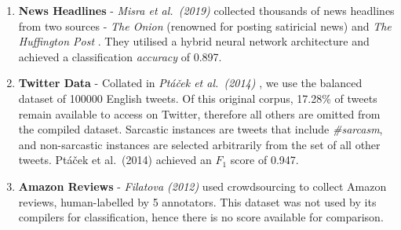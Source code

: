 \documentclass[12pt,a4paper]{article}
\begin{document}
\begin{enumerate}[leftmargin=0cm]
	\item \textbf{News Headlines} - \textit{Misra et al.\ (2019)} \cite{misra2019sarcasm} collected thousands of news headlines from two sources - \textit{The Onion} \footnotemark[3] (renowned for posting satiricial news) and \textit{The Huffington Post} \footnotemark[4]. They utilised a hybrid neural network architecture and achieved a classification \textit{accuracy} of 0.897.\vspace{-5pt}
	
	\item \textbf{Twitter Data} - Collated in \textit{Pt\'a\v{c}ek et al.\ (2014)} \cite{ptavcek2014sarcasm}, we use the balanced dataset of 100000 English tweets. Of this original corpus, 17.28\% of tweets remain available to access on Twitter, therefore all others are omitted from the compiled dataset. Sarcastic instances are tweets that include \textit{\#sarcasm}, and non-sarcastic instances are selected arbitrarily from the set of all other tweets. Pt\'a\v{c}ek et al.\ (2014) \cite{ptavcek2014sarcasm} achieved an $F_{1}$ score of 0.947.\vspace{-5pt}
	
	\item \textbf{Amazon Reviews} - \textit{Filatova (2012)} \cite{filatova2012irony} used crowdsourcing to collect Amazon reviews, human-labelled by 5 annotators. This dataset was not used by its compilers for classification, hence there is no score available for comparison.
\end{enumerate}

\end{document}
